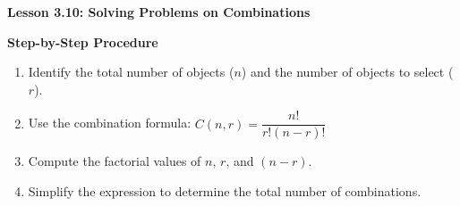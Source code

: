 \begin{center}
\textbf{Lesson 3.10: Solving Problems on Combinations}
\end{center}

\vspace*{-1.5ex}

\noindent\textbf{Step-by-Step Procedure}

\begin{enumerate}
    \item Identify the total number of objects (\(n\)) and the number of objects to select (\(r\)).
    \item Use the combination formula:    \(C(n, r) = \dfrac{n!}{r!(n-r)!}\)
    \item Compute the factorial values of \(n\), \(r\), and \((n-r)\).
    \item Simplify the expression to determine the total number of combinations.
\end{enumerate}
